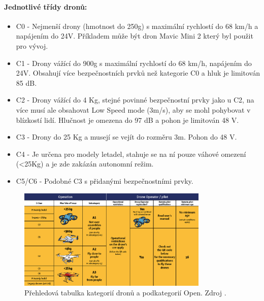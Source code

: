 \paragraph{Jednotlivé třídy dronů:}
\begin{itemize}
    \item C0 - Nejmenší drony (hmotnost do 250g) s maximální rychlostí do 68 km/h a napájením do 24V. Příkladem může být dron Mavic Mini 2 který byl použit pro vývoj. 
    \item C1 - Drony vážící do 900g s maximální rychlostí do 68 km/h, napájením do 24V. Obsahují více bezpečnostních prvků než kategorie C0 a hluk je limitován 85 dB.
    \item C2 - Drony vážící do 4 Kg, stejné povinné bezpečnostní prvky jako u C2, na více musí ale obsahovat Low Speed mode (3m/s), aby se mohl pohybovat v blízkostí lidí. Hlučnost je omezena do 97 dB a pohon je limitován 48 V.
    \item C3 - Drony do 25 Kg a musejí se vejít do rozměru 3m. Pohon do 48 V.
    \item C4 - Je určena pro modely letadel, stahuje se na ní pouze váhové omezení (<25Kg) a je zde zakázán autonomní režim. 
    \item C5/C6 - Podobné C3 s přidanými bezpečnostními prvky.
\end{itemize}


\begin{figure}[ht]
	\centering
	\includegraphics[width=0.81\textwidth]{obrazky-figures/drony/droneCatTable.png}
	\caption{Přehledová tabulka kategorií dronů a podkategorií Open.  Zdroj \cite{EASA:openSouhrn2024}.}
	\label{covpitDrLiner}
\end{figure}


